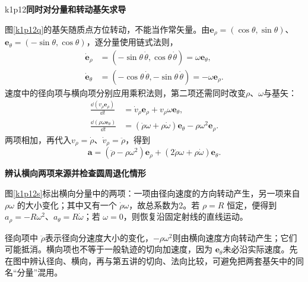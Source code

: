 \begin{drillsolution}{k1p12}\textbf{同时对分量和转动基矢求导}\par\nobreak
图\ref{k1p12q}的基矢随质点方位转动，不能当作常矢量。由$\bm e_\rho=(\cos\theta,\sin\theta)$、$\bm e_\theta=(-\sin\theta,\cos\theta)$，逐分量使用链式法则，
\begin{align*}
\dot{\bm e}_\rho&=(-\sin\theta\,\dot\theta,\cos\theta\,\dot\theta)
=\omega\bm e_\theta,\\
\dot{\bm e}_\theta&=(-\cos\theta\,\dot\theta,-\sin\theta\,\dot\theta)
=-\omega\bm e_\rho.
\end{align*}
速度中的径向项与横向项分别应用乘积法则，第二项还需同时改变$\rho$、$\omega$与基矢：
\begin{align*}
\frac{\dd(v_\rho\bm e_\rho)}{\dd t}
&=\dot v_\rho\bm e_\rho+v_\rho\omega\bm e_\theta,\\
\frac{\dd(\rho\omega\bm e_\theta)}{\dd t}
&=(\dot\rho\omega+\rho\dot\omega)\bm e_\theta
  -\rho\omega^2\bm e_\rho.
\end{align*}
两项相加，再代入$v_\rho=\dot\rho$、$\dot v_\rho=\ddot\rho$，得到
\[
\bm a=\boxed{(\ddot\rho-\rho\omega^2)\bm e_\rho
 +(2\dot\rho\omega+\rho\dot\omega)\bm e_\theta}.
\]



\par\medskip{}\noindent\textbf{辨认横向两项来源并检查圆周退化情形}\par\nobreak
图\ref{k1p12s}标出横向分量中的两项：一项由径向速度的方向转动产生，另一项来自 $\rho\omega$ 的大小变化；其中又有一个 $\dot\rho\omega$，故总系数为2。若 $\rho=R$ 恒定，便得到 $a_\rho=-R\omega^2$、$a_\theta=R\dot\omega$；若 $\omega=0$，则恢复沿固定射线的直线运动。

径向项中 $\ddot\rho$表示径向分速度大小的变化，$-\rho\omega^2$则由横向速度方向转动产生；它们可能抵消。横向项也不等于一般轨迹的切向加速度，因为 $\bm e_\theta$未必沿实际速度。先在图中辨认径向、横向，再与第五讲的切向、法向比较，可避免把两套基矢中的同名“分量”混用。


\end{drillsolution}

